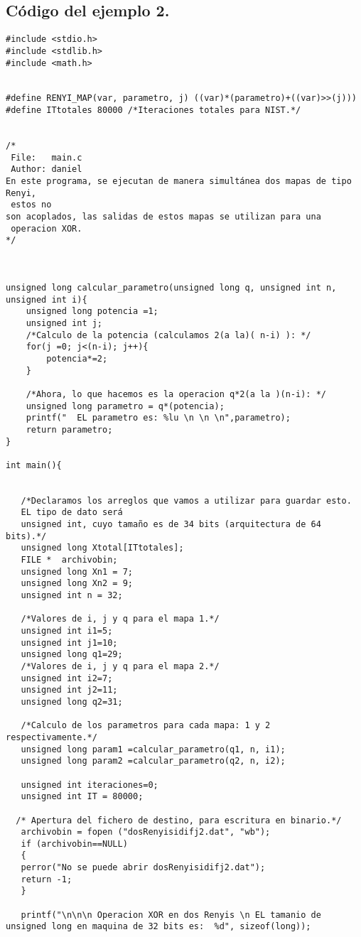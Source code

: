 \documentclass[12pt,3p]{elsarticle}
\begin{document}
\subsection{Código del ejemplo 2.}
\begin{verbatim}
#include <stdio.h>
#include <stdlib.h>
#include <math.h>


#define RENYI_MAP(var, parametro, j) ((var)*(parametro)+((var)>>(j)))
#define ITtotales 80000 /*Iteraciones totales para NIST.*/


/*
 File:   main.c
 Author: daniel
En este programa, se ejecutan de manera simultánea dos mapas de tipo Renyi,
 estos no
son acoplados, las salidas de estos mapas se utilizan para una
 operacion XOR.
*/



unsigned long calcular_parametro(unsigned long q, unsigned int n, unsigned int i){    
    unsigned long potencia =1;
    unsigned int j;
    /*Calculo de la potencia (calculamos 2(a la)( n-i) ): */
    for(j =0; j<(n-i); j++){
        potencia*=2;
    }

    /*Ahora, lo que hacemos es la operacion q*2(a la )(n-i): */
    unsigned long parametro = q*(potencia);
    printf("  EL parametro es: %lu \n \n \n",parametro);
    return parametro;
}

int main(){
 
   
   /*Declaramos los arreglos que vamos a utilizar para guardar esto. 
   EL tipo de dato será
   unsigned int, cuyo tamaño es de 34 bits (arquitectura de 64 bits).*/
   unsigned long Xtotal[ITtotales]; 
   FILE *  archivobin; 
   unsigned long Xn1 = 7;
   unsigned long Xn2 = 9;
   unsigned int n = 32;

   /*Valores de i, j y q para el mapa 1.*/
   unsigned int i1=5; 
   unsigned int j1=10; 
   unsigned long q1=29;
   /*Valores de i, j y q para el mapa 2.*/
   unsigned int i2=7; 
   unsigned int j2=11; 
   unsigned long q2=31;
 
   /*Calculo de los parametros para cada mapa: 1 y 2 respectivamente.*/
   unsigned long param1 =calcular_parametro(q1, n, i1);
   unsigned long param2 =calcular_parametro(q2, n, i2);
 
   unsigned int iteraciones=0;
   unsigned int IT = 80000;

  /* Apertura del fichero de destino, para escritura en binario.*/
   archivobin = fopen ("dosRenyisidifj2.dat", "wb");
   if (archivobin==NULL)
   {
   perror("No se puede abrir dosRenyisidifj2.dat");
   return -1;
   }
   
   printf("\n\n\n Operacion XOR en dos Renyis \n EL tamanio de unsigned long en maquina de 32 bits es:  %d", sizeof(long));




\end{verbatim}
\end{document}
